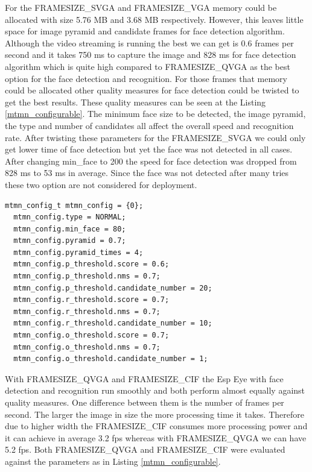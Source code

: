 For the {\selectfont FRAMESIZE\_SVGA} and {\selectfont FRAMESIZE\_VGA}  memory could be allocated with size 5.76 MB and 3.68 MB respectively. However, this leaves little space for image pyramid and candidate frames for face detection algorithm. Although the video streaming is running the best we can get is 0.6 frames per second and it takes 750 ms to capture the image  and 828 ms for face detection algorithm which is quite high compared to {\selectfont FRAMESIZE\_QVGA} as the best option for the face detection and recognition. For those frames that memory could be allocated other quality measures for face detection could be twisted to get the best results. These quality measures can be seen at the Listing \ref{mtmn_configurable}. The minimum face size to be detected, the image pyramid, the type and number of candidates all affect the overall speed and recognition rate. 
After twisting these parameters for the {\selectfont FRAMESIZE\_SVGA} we could only get lower time of face detection but yet the face was not detected in all cases. After changing {\selectfont min\_face} to 200 the speed for face detection was dropped from 828 ms to 53 ms in average. Since the face was not detected after many tries these two option are not considered for deployment. 



\begin{lstlisting}[caption={Face detection configurable parameters.},label=mtmn_configurable, captionpos=b]
 mtmn_config_t mtmn_config = {0};
  mtmn_config.type = NORMAL;
  mtmn_config.min_face = 80;
  mtmn_config.pyramid = 0.7; 
  mtmn_config.pyramid_times = 4;
  mtmn_config.p_threshold.score = 0.6;
  mtmn_config.p_threshold.nms = 0.7;
  mtmn_config.p_threshold.candidate_number = 20; 
  mtmn_config.r_threshold.score = 0.7;
  mtmn_config.r_threshold.nms = 0.7;
  mtmn_config.r_threshold.candidate_number = 10;
  mtmn_config.o_threshold.score = 0.7;
  mtmn_config.o_threshold.nms = 0.7;
  mtmn_config.o_threshold.candidate_number = 1;

\end{lstlisting}

With {\selectfont FRAMESIZE\_QVGA} and {\selectfont FRAMESIZE\_CIF} the Esp Eye with face detection and recognition run smoothly and both perform almost equally against quality measures. One difference between them is the number of frames per second. The larger the image in size the more processing time it takes. Therefore due to higher width the {\selectfont FRAMESIZE\_CIF} consumes more processing power and it can achieve in average 3.2 fps whereas with {\selectfont FRAMESIZE\_QVGA} we can have 5.2 fps. 
Both {\selectfont FRAMESIZE\_QVGA} and {\selectfont FRAMESIZE\_CIF} were evaluated against the parameters as in Listing \ref{mtmn_configurable}.

